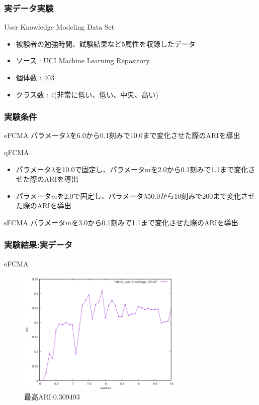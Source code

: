\documentclass[13pt,dvipdfmx]{beamer}
\begin{document}
\begin{frame}\frametitle{実データ実験}
  \begin{block}{User Knowledge Modeling Data Set}
    \begin{itemize}
    \item 被験者の勉強時間、試験結果など5属性を収録したデータ
    \item ソース : UCI  Machine Learning Repository
    \item 個体数 : 403
    \item クラス数 : 4(非常に低い、低い、中央、高い)
    \end{itemize}
  \end{block}
\end{frame}


\begin{frame}\frametitle{実験条件}
\begin{block}{eFCMA}
  パラメータ$\lambda$を6.0から0.1刻みで10.0まで変化させた際のARIを導出
\end{block}
\begin{block}{qFCMA}
  \begin{itemize}
  \item パラメータ$\lambda$を10.0で固定し、パラメータmを2.0から0.1刻みで1.1まで変化させた際のARIを導出
  \item パラメータ$m$を2.0で固定し、パラメータ$\lambda$50.0から10刻みで200まで変化させた際のARIを導出
  \end{itemize}
\end{block}
\begin{block}{sFCMA}
  パラメータ$m$を3.0から0.1刻みで1.1まで変化させた際のARIを導出
\end{block}

\end{frame}

\begin{frame}\frametitle{実験結果:実データ}
  \begin{block}{eFCMA}
   \begin{figure}[htbp]
    \begin{center}
     \includegraphics[height=60mm]{efcma_ARI.png}
   \end{center}
   \captionsetup{labelformat=empty,labelsep=none}
   \caption{最高ARI:0.309493}
  \end{figure}
 \end{block}
\end{frame}
\end{document}

